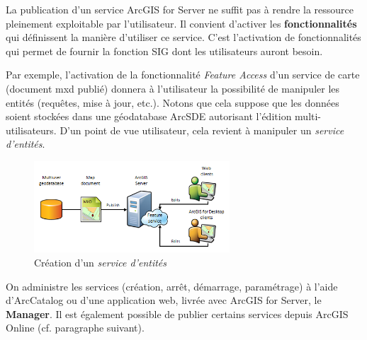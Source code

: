 \documentclass[11pt]{article}
\begin{document}
La publication d'un service ArcGIS for Server ne suffit pas à rendre la ressource pleinement exploitable par l'utilisateur. Il convient d'activer les \textbf{fonctionnalités} qui définissent la manière d'utiliser ce service. C'est l'activation de fonctionnalités qui permet de fournir la fonction SIG dont les utilisateurs auront besoin.

Par exemple, l'activation de la fonctionnalité \textit{Feature Access} d'un service de carte (document mxd publié) donnera à l'utilisateur la possibilité de manipuler les entités (requêtes, mise à jour, etc.). Notons que cela suppose que les données soient stockées dans une géodatabase ArcSDE autorisant l'édition multi-utilisateurs. D'un point de vue utilisateur, cela revient à manipuler un \textit{service d'entités}.

\begin{figure}[H]
	\center \includegraphics[width=0.65\textwidth]{img/cours/publication_feature_service.png}
	\caption{Création d'un \textit{service d'entités}}
\end{figure}

On administre les services (création, arrêt, démarrage, paramétrage) à l'aide  d'ArcCatalog ou d'une application web, livrée avec ArcGIS for Server, le \textbf{Manager}. Il est également possible de publier certains services depuis ArcGIS Online (cf. paragraphe suivant).
\end{document}
